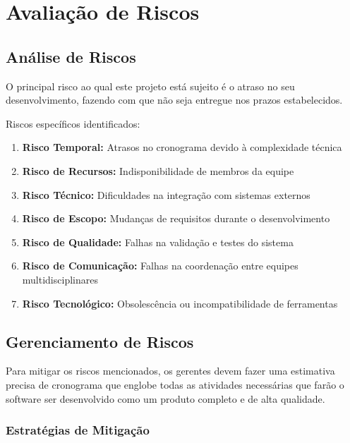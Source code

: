 \section{Avaliação de Riscos}

\subsection{Análise de Riscos}

O principal risco ao qual este projeto está sujeito é o atraso no seu desenvolvimento, fazendo com que não seja entregue nos prazos estabelecidos.

Riscos específicos identificados:

\begin{enumerate}
    \item \textbf{Risco Temporal:} Atrasos no cronograma devido à complexidade técnica
    \item \textbf{Risco de Recursos:} Indisponibilidade de membros da equipe
    \item \textbf{Risco Técnico:} Dificuldades na integração com sistemas externos
    \item \textbf{Risco de Escopo:} Mudanças de requisitos durante o desenvolvimento
    \item \textbf{Risco de Qualidade:} Falhas na validação e testes do sistema
    \item \textbf{Risco de Comunicação:} Falhas na coordenação entre equipes multidisciplinares
    \item \textbf{Risco Tecnológico:} Obsolescência ou incompatibilidade de ferramentas
\end{enumerate}

\subsection{Gerenciamento de Riscos}

Para mitigar os riscos mencionados, os gerentes devem fazer uma estimativa precisa de cronograma que englobe todas as atividades necessárias que farão o software ser desenvolvido como um produto completo e de alta qualidade.

\subsubsection{Estratégias de Mitigação}

